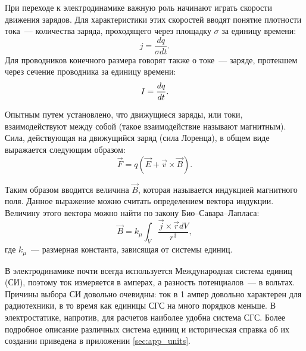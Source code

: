При переходе к электродинамике важную роль начинают играть скорости движения
зарядов. Для характеристики этих скоростей вводят понятие плотности тока~---
количества заряда, проходящего через площадку $\sigma$ за единицу времени:
\begin{equation}
	j = \frac{dq}{\sigma dt}.
\end{equation}
Для проводников конечного размера говорят также о токе~--- заряде, протекшем
через сечение проводника за единицу времени:
\begin{equation}
	\eqmark{current}
	I = \frac{dq}{dt}.
\end{equation}

Опытным путем установлено, что движущиеся заряды, или токи, взаимодействуют
между собой (такое взаимодействие называют магнитным). Сила, действующая на
движущийся заряд (сила Лоренца), в общем виде выражается следующим образом:
\begin{equation}
	\vec{F} = q \left( \vec{E} + \vec{v} \times \vec{B} \right).
\end{equation}

Таким образом вводится величина $\vec{B}$, которая называется индукцией
магнитного поля. Данное выражение можно считать определением вектора индукции.
Величину этого вектора можно найти по закону Био--Савара--Лапласа:
\begin{equation}
	\vec{B} = k_{\mu}\int_{V}{\frac{\vec{j} \times \vec{r} dV}{r^3}},
\end{equation}
где $k_{\mu}$~--- размерная константа, зависящая от системы единиц.


В электродинамике почти всегда используется Международная система единиц (СИ),
поэтому ток измеряется в амперах, а разность потенциалов~--- в вольтах.
Причины
выбора СИ довольно очевидны: ток в 1 ампер довольно характерен для радиотехники,
в то время как единицы СГС на много порядков меньше. В электростатике, напротив,
для расчетов наиболее удобна система СГС.
Более подробное описание различных
система единиц и историческая справка об их создании приведена в приложении
\ref{sec:app_units}.

